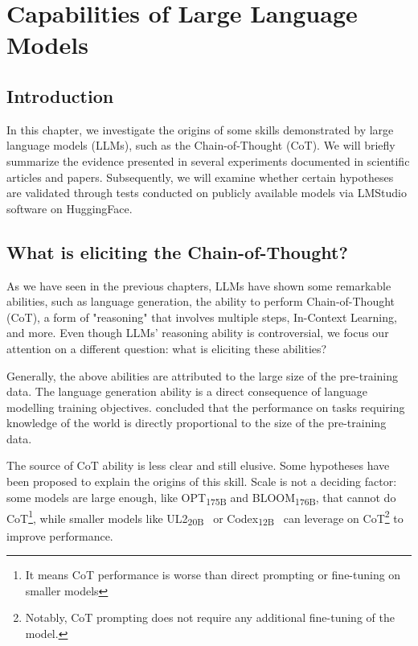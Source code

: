 
\chapter{Capabilities of Large Language Models}
\label{ch:capabilities}

\section{Introduction}
\label{sec:ch4-introduction}

In this chapter, we investigate the origins of some skills demonstrated by large language models (LLMs), such as the Chain-of-Thought (CoT).
We will briefly summarize the evidence presented in several experiments documented in scientific articles and papers.
Subsequently, we will examine whether certain hypotheses are validated through tests conducted on publicly available models via LMStudio software on HuggingFace.

\section{What is eliciting the Chain-of-Thought?}
\label{sec:what-is-eliciting-the-chain-of-thought?}

As we have seen in the previous chapters, LLMs have shown some remarkable abilities, such as language generation, the ability to perform Chain-of-Thought (CoT), a form of "reasoning" that involves multiple steps, In-Context Learning, and more.
Even though LLMs' reasoning ability is controversial, we focus our attention on a different question: what is eliciting these abilities?

Generally, the above abilities are attributed to the large size of the pre-training data.
The language generation ability is a direct consequence of language modelling training objectives.
\textcite{liang2022holistic} concluded that the performance on tasks requiring knowledge of the world is directly proportional to the size of the pre-training data.

The source of CoT ability is less clear and still elusive.
Some hypotheses have been proposed to explain the origins of this skill.
Scale is not a deciding factor: some models are large enough, like OPT\textsubscript{175B} and BLOOM\textsubscript{176B}, that cannot do CoT\footnote{It means CoT performance is worse than direct prompting or fine-tuning on smaller models}, while smaller models like UL2\textsubscript{20B}~\cite{tay2023ul2unifyinglanguagelearning} or Codex\textsubscript{12B}~\cite{chen2021evaluating} can leverage on CoT\footnote{Notably, CoT prompting does not require any additional fine-tuning of the model.} to improve performance.

